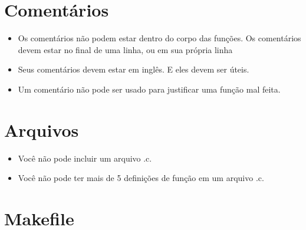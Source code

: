 \documentclass{42-pt}
\begin{document}
    \section{Comentários}

        \begin{itemize}

            \item Os comentários não podem estar dentro do corpo das funções.
                Os comentários devem estar no final de uma linha, ou em sua própria linha

            \item Seus comentários devem estar em inglês. E eles devem ser
                úteis.

            \item Um comentário não pode ser usado para justificar uma função 
				mal feita.

        \end{itemize}
        \newpage


    \section{Arquivos}

        \begin{itemize}

            \item Você não pode incluir um arquivo .c.

            \item Você não pode ter mais de 5 definições de função em um arquivo .c.

        \end{itemize}
        \newpage


    \section{Makefile}
\end{document}

